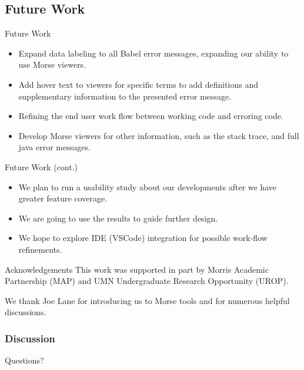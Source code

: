 \documentclass{beamer}
\begin{document}
\subsection{Future Work}
\begin{frame}{Future Work}
  \begin{itemize}
    \item<1-> Expand data labeling to all Babel error messages, expanding our ability to use Morse viewers.
    \item<2-> Add hover text to viewers for specific terms to add definitions and supplementary information to the presented error message.
    \item<3-> Refining the end user work flow between working code and erroring code.
    \item<4-> Develop Morse viewers for other information, such as the stack trace, and full java error messages.
  \end{itemize}
  \end{frame}

\begin{frame}{Future Work (cont.)}
  \begin{itemize}
    \item<1-> We plan to run a usability study about our developments after we have greater feature coverage.
    \item<2-> We are going to use the results to guide further design.
    \item<3-> We hope to explore IDE (VSCode) integration for possible work-flow refinements.
  \end{itemize}
\end{frame}

\begin{frame}{Acknowledgements}
This work was supported in part by Morris Academic Partnership (MAP) and UMN Undergraduate Research Opportunity (UROP).  \\ 

\vspace*{0.2in}

We thank Joe Lane for introducing us to Morse tools and for numerous helpful discussions.
\end{frame}

\begin{frame}
  \frametitle{Discussion}
Questions?
\end{frame}
\end{document}
